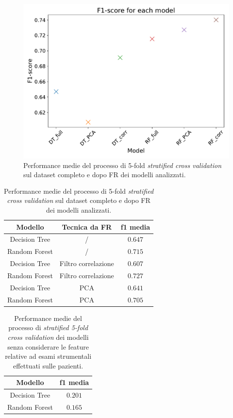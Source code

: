 \begin{figure}
	\centering
	\includegraphics[width=0.8\linewidth]{images/fscore}
	\caption{Performance medie del processo di 5-fold \textit{stratified cross validation} sul dataset completo e dopo FR dei modelli analizzati.}
	\label{fig:fscore}
\end{figure}

\begin{table}
\centering
\caption{Performance medie del processo di 5-fold \textit{stratified cross validation} sul dataset completo e dopo FR dei modelli analizzati.}
\label{tab:f1score}
\begin{tabular}{|c|c|c|}
	\toprule
	Modello & Tecnica da FR & f1 media \\ 
	\midrule 
	Decision Tree & / & $0.647$ \\  
	Random Forest & / & $0.715$ \\ 
	Decision Tree & Filtro correlazione & $0.607$ \\ 
	Random Forest & Filtro correlazione & $0.727$ \\ 
	Decision Tree & PCA & $0.641$ \\ 
	Random Forest & PCA & $0.705$ \\ 
	\bottomrule
\end{tabular}
\end{table}

\begin{table}
	\centering
	\caption{Performance medie del processo di \textit{stratified 5-fold cross validation} dei modelli senza considerare le feature relative ad esami strumentali effettuati sulle pazienti.}
	\label{tab:noexamsscore}
	\begin{tabular}{|c|c|}
		\toprule
		Modello & f1 media \\ 
		\midrule 
		Decision Tree & $0.201$ \\  
		Random Forest  & $0.165$ \\ 
		\bottomrule
	\end{tabular}
\end{table}

